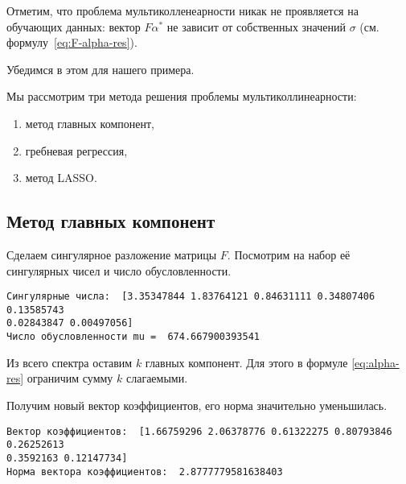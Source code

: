 \documentclass[11pt,a4paper]{article}
\providecommand{\tightlist}{%
      \setlength{\itemsep}{0pt}\setlength{\parskip}{0pt}}
\begin{document}
    Отметим, что проблема мультиколленеарности никак не проявляется на
обучающих данных: вектор \(F\alpha^*\) не зависит от собственных
значений \(\sigma\) (см. формулу~\eqref{eq:F-alpha-res}).

Убедимся в этом для нашего примера.


    Мы рассмотрим три метода решения проблемы мультиколлинеарности:

\begin{enumerate}
\def\labelenumi{\arabic{enumi}.}
\tightlist
\item
  метод главных компонент,
\item
  гребневая регрессия,
\item
  метод LASSO.
\end{enumerate}

    \hypertarget{ux43cux435ux442ux43eux434-ux433ux43bux430ux432ux43dux44bux445-ux43aux43eux43cux43fux43eux43dux435ux43dux442}{%
\subsection{Метод главных
компонент}\label{ux43cux435ux442ux43eux434-ux433ux43bux430ux432ux43dux44bux445-ux43aux43eux43cux43fux43eux43dux435ux43dux442}}

Сделаем сингулярное разложение матрицы \(F\). Посмотрим на набор её
сингулярных чисел и число обусловленности.


    \begin{Verbatim}[commandchars=\\\{\}]
Сингулярные числа:  [3.35347844 1.83764121 0.84631111 0.34807406 0.13585743
0.02843847 0.00497056]
Число обусловленности mu =  674.667900393541
    \end{Verbatim}

    Из всего спектра оставим \(k\) главных компонент. Для этого в формуле
\eqref{eq:alpha-res} ограничим сумму \(k\) слагаемыми.

Получим новый вектор коэффициентов, его норма значительно уменьшилась.



    \begin{Verbatim}[commandchars=\\\{\}]
Вектор коэффициентов:  [1.66759296 2.06378776 0.61322275 0.80793846 0.26252613
0.3592163 0.12147734]
Норма вектора коэффициентов:  2.8777779581638403
    \end{Verbatim}


    \begin{center}
    \end{center}
    { \hspace*{\fill} \\}
    
\end{document}

